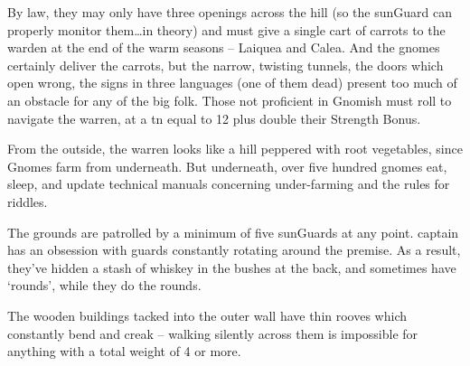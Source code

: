 \begin{multicols}{2}
By law, they may only have three openings across the hill (so the \gls{sunGuard} can properly monitor them\ldots in theory) and must give a single cart of carrots to the \gls{warden} at the end of the warm seasons -- Laiquea and Calea.
And the gnomes certainly deliver the carrots, but the narrow, twisting tunnels, the doors which open wrong, the signs in three languages (one of them dead) present too much of an obstacle for any of the big folk.
Those not proficient in Gnomish must roll  to navigate the warren, at a \gls{tn} equal to 12 plus double their Strength Bonus.

From the outside, the warren looks like a hill peppered with root vegetables, since Gnomes farm from underneath.%
But underneath, over five hundred gnomes eat, sleep, and update technical manuals concerning under-farming and the rules for riddles.


The grounds are patrolled by a minimum of five \glspl{sunGuard} at any point.
\Gls{captain} has an obsession with guards constantly rotating around the premise.
As a result, they've hidden a stash of whiskey in the bushes at the back, and sometimes have `rounds', while they do the rounds.

The wooden buildings tacked into the outer wall have thin rooves which constantly bend and creak -- walking silently across them is impossible for anything with a total weight of 4 or more.




\end{multicols}
